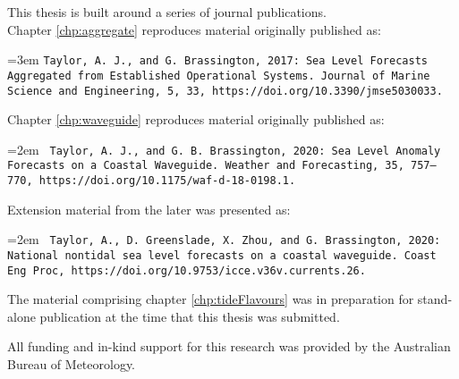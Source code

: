 
\begin{preface}

\noindent
This thesis is built around a series of journal publications. \\
Chapter \ref{chp:aggregate} reproduces material originally published as:

\vspace{5mm}
\hangindent=3em
\texttt{Taylor, A. J., and G. Brassington, 2017: Sea Level Forecasts Aggregated from Established Operational Systems. Journal of Marine Science and Engineering, 5, 33, https://doi.org/10.3390/jmse5030033.}


\vspace{5mm}
\noindent
Chapter \ref{chp:waveguide} reproduces material originally published as:

\vspace{5mm}
\hangindent=2em
\texttt{
Taylor, A. J., and G. B. Brassington, 2020: Sea Level Anomaly Forecasts on a Coastal Waveguide. Weather and Forecasting, 35, 757–770, https://doi.org/10.1175/waf-d-18-0198.1.}

\vspace{5mm}
\noindent
Extension material from the later was presented as:

\vspace{5mm}
\hangindent=2em
\texttt{
Taylor, A., D. Greenslade, X. Zhou, and G. Brassington, 2020: National nontidal sea level forecasts on a coastal waveguide. Coast Eng Proc, https://doi.org/10.9753/icce.v36v.currents.26.}

\vspace{5mm}
\noindent
The material comprising chapter \ref{chp:tideFlavours} was in preparation for stand-alone publication at the time that this thesis was submitted.

\vspace{5mm}
\noindent 
All funding and in-kind support for this research was provided by the Australian Bureau of Meteorology.

\end{preface}

